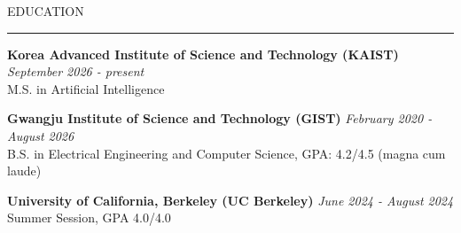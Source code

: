\documentclass{resume} %
\renewenvironment{rSection}[1]{
\vspace{-0.5 em} %
\sectionskip
\textcolor{RoyalPurple}{\MakeUppercase{#1}}
\sectionlineskip
\hrule
\begin{list}{}{
\setlength{\leftmargin}{1.5em}
}
\item[]
}{
\end{list}
}
\begin{document}

\begin{rSection}{Education}


{\bf Korea Advanced Institute of Science and Technology (KAIST)} \hfill {\em September 2026 - present}{}
\\ M.S. in Artificial Intelligence \hfill

{\bf Gwangju Institute of Science and Technology (GIST)} \hfill {\em February 2020 - August 2026}{}
\\ B.S. in Electrical Engineering and Computer Science, GPA: 4.2/4.5 (magna cum laude) \hfill

{\bf University of California, Berkeley (UC Berkeley)} \hfill {\em June 2024 - August 2024}
\\ Summer Session, GPA 4.0/4.0 \hfill

\end{rSection}
\end{document}

